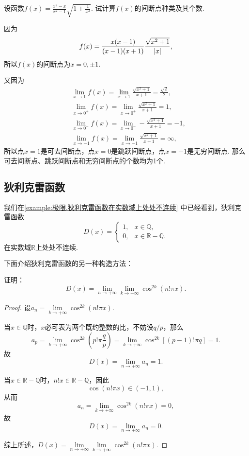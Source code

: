 \begin{example}
设函数\(f(x) = \frac{x^2-x}{x^2-1}\sqrt{1+\frac{1}{x^2}}\).
试计算\(f(x)\)的间断点种类及其个数.
\begin{solution}
因为\[
f(x) = \frac{x(x-1)}{(x-1)(x+1)} \frac{\sqrt{x^2+1}}{\abs{x}},
\]所以\(f(x)\)的间断点为\(x=0,\pm1\).

又因为\begin{align*}
&\lim\limits_{x\to1} f(x)
= \lim\limits_{x\to1} \frac{\sqrt{x^2+1}}{x+1}
= \frac{\sqrt{2}}{2}, \\
&\lim\limits_{x\to0^+} f(x)
= \lim\limits_{x\to0^+} \frac{\sqrt{x^2+1}}{x+1}
= 1, \\
&\lim\limits_{x\to0^-} f(x)
= \lim\limits_{x\to0^-} -\frac{\sqrt{x^2+1}}{x+1}
= -1, \\
&\lim\limits_{x\to-1} f(x)
= \lim\limits_{x\to-1} \frac{\sqrt{x^2+1}}{x+1}
= \infty,
\end{align*}
所以点\(x=1\)是可去间断点，点\(x=0\)是跳跃间断点，点\(x=-1\)是无穷间断点.
那么可去间断点、跳跃间断点和无穷间断点的个数均为1个.
\end{solution}
\end{example}

\subsection{狄利克雷函数}
我们在\cref{example:极限.狄利克雷函数在实数域上处处不连续} 中已经看到，狄利克雷函数\[
D(x) = \left\{ \begin{array}{ll}
1, & x \in \mathbb{Q}, \\
0, & x \in \mathbb{R} - \mathbb{Q}.
\end{array} \right.
\]在实数域\(\mathbb{R}\)上处处不连续.

下面介绍狄利克雷函数的另一种构造方法：
\begin{example}
证明：\[
D(x) = \lim\limits_{n\to+\infty} \lim\limits_{k\to+\infty} \cos^{2k}(n! \pi x).
\]
\begin{proof}
设\(a_n = \lim\limits_{k\to+\infty} \cos^{2k}(n! \pi x)\).

当\(x \in \mathbb{Q}\)时，\(x\)必可表为两个既约整数的比，不妨设\(q/p\)，那么\[
a_p = \lim\limits_{k\to+\infty} \cos^{2k}\left(p! \pi \frac{q}{p}\right)
= \lim\limits_{k\to+\infty} \cos^{2k}[(p-1)! \pi q] = 1.
\]故\[
D(x) = \lim\limits_{n\to+\infty} a_n = 1.
\]

当\(x \in \mathbb{R}-\mathbb{Q}\)时，\(n! x \in \mathbb{R}-\mathbb{Q}\)，因此\[
\cos(n! \pi x) \in (-1,1),
\]从而\[
a_n = \lim\limits_{k\to+\infty} \cos^{2k}(n! \pi x) = 0,
\]故\[
D(x) = \lim\limits_{n\to+\infty} a_n = 0.
\]

综上所述，\(D(x) = \lim\limits_{n\to+\infty} \lim\limits_{k\to+\infty} \cos^{2k}(n! \pi x)\).
\end{proof}
\end{example}


